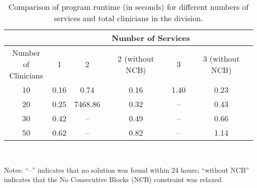 \begin{table}[htbp]
	\centering
 	\caption{Comparison of program runtime (in seconds) for different numbers of services and total clinicians in the division.}%
  \label{tbl:runtime-services-clinicians-comparison}%
	\begin{tabular}{|c|c||c|c||c|c|}
		\toprule
		                                      &  \multicolumn{5}{c|}{Number of Services}  \\ \midrule
		\makecell[l]{Number of \\ Clinicians} &  1   &    2    & 2 (without NCB) &  3   & 3 (without NCB) \\ \midrule
		                 10                   & 0.16 &  0.74   &  0.16   & 1.40 &  0.23   \\ \hline
		                 20                   & 0.25 & 7468.86 &  0.32   &  --  &  0.43   \\ \hline
		                 30                   & 0.42 &    --   &  0.49   &  --  &  0.66   \\ \hline
		                 50                   & 0.62 &    --   &  0.82   &  --  &  1.14   \\ \bottomrule
	\end{tabular}\\[1em]
  \footnotesize\raggedright
  Notes:
  ``--'' indicates that no solution was found within 24 hours;
  ``without NCB'' indicates that the No Consecutive Blocks (NCB) constraint was relaxed.
\end{table}